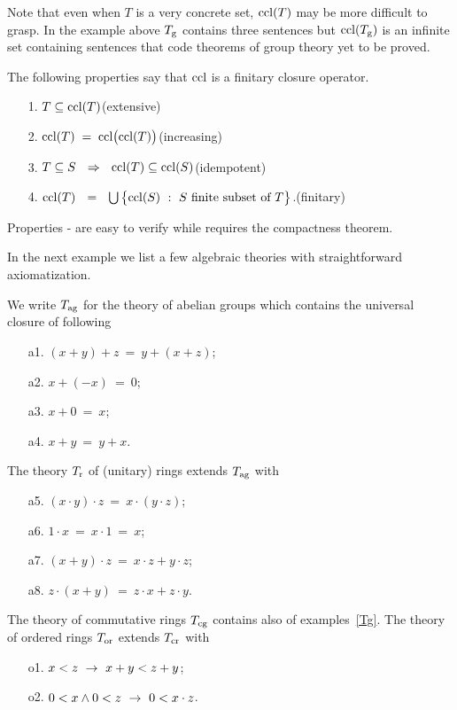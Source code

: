 \documentclass[creche.tex]{subfiles}
\begin{document}
Note that even when $T$ is a very concrete set, ${\rm ccl}(T)$ may be more difficult to grasp.
In the example above $T_{\rm g}$ contains three sentences but ${\rm ccl}(T_{\rm g})$ is an infinite set containing sentences that code theorems of group theory yet to be proved.

\begin{remark}
The following properties say that ${\rm ccl}$ is a finitary closure operator.
\begin{itemize}
\item[1.] $T\subseteq{\rm ccl}(T)$\hfill (extensive)
\item[2.] ${\rm ccl}(T)\;=\;{\rm ccl}\big({\rm ccl}(T)\big)$\hfill (increasing)
\item[3.] $T\subseteq S\ \ \IMP\ \ \ccl(T)\subseteq\ccl(S)$\hfill (idempotent)
\item[4.] ${\rm ccl}(T)\ \ =\ \ \bigcup\big\{{\rm ccl}(S)\ :\ S \textrm{ finite subset of } T\big\}$.\hfill (finitary)
\end{itemize}
Properties - are easy to verify while  requires the compactness theorem.\QED
\end{remark}

In the next example we list a few algebraic theories with straightforward axiomatization.

\begin{example}
We write $T_{\rm ag}$ for the theory of abelian groups which contains the universal closure of following
\begin{itemize}
\item[a1.] $(x+y) +z\ =\ y+(x+z)$;
\item[a2.] $x+(-x)\ =\ 0$;
\item[a3.] $x+0\ = \ x$;
\item[a4.] $x+y\ =\ y+x$.
\end{itemize}
The theory $T_{\rm r}$ of (unitary) rings extends $T_{\rm ag}$ with
\begin{itemize}
\item[a5.] $(x\cdot  y)\cdot  z\  =\ x\cdot (y\cdot  z)$;
\item[a6.] $1\cdot  x\ =\ x\cdot  1\ =\ x$;
\item[a7.] $(x+y)\cdot  z\ =\ x\cdot  z + y\cdot  z$;
\item[a8.] $z\cdot  (x+y)\ =\ z\cdot  x + z\cdot  y$.
\end{itemize}
The theory of commutative rings $T_{\rm cg}$ contains also  of examples~\ref{Tg}.
The theory of ordered rings $T_{\rm or}$ extends $T_{\rm cr}$ with
\begin{itemize}
\item[o1.] $x<z\ \rightarrow\ x+y<z+y$;
\item[o2.] $0<x \wedge 0<z\ \rightarrow\ 0<x\cdot z$.\QED
\end{itemize}
\end{example}
\end{document}
